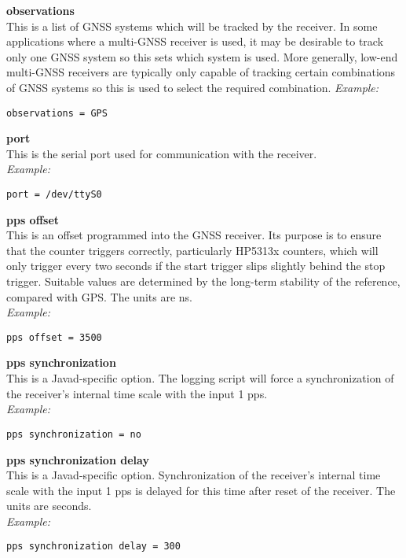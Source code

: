 {\bfseries observations}\\
This is a list of GNSS systems which will be tracked by the receiver. 
In some applications where a multi-GNSS receiver is used, it may be desirable to track
only one GNSS system so this sets which system is used.
More generally, low-end multi-GNSS receivers are typically only capable of tracking
certain combinations of GNSS systems so this is used to select the required combination.
\textit{Example:}
\begin{lstlisting}
observations = GPS
\end{lstlisting}

{\bfseries port}\\
This is the serial port used for communication with the receiver.\\
\textit{Example:}
\begin{lstlisting}
port = /dev/ttyS0
\end{lstlisting}

{\bfseries pps offset}\\ 
This is an offset programmed into the GNSS receiver. Its purpose is to ensure that the counter
triggers correctly, particularly HP5313x counters, which will only trigger every two seconds if the 
start trigger slips slightly behind the stop trigger. Suitable values are determined by the long-term stability of the
reference, compared with GPS.
The units are ns.\\
\textit{Example:}
\begin{lstlisting}
pps offset = 3500
\end{lstlisting}

{\bfseries pps synchronization}\\ \hypertarget{h:pps_synchronization}{}
This is a Javad-specific option. The logging script will force a synchronization of the receiver's
internal time scale with the input 1 pps.\\
\textit{Example:}
\begin{lstlisting}
pps synchronization = no
\end{lstlisting}

{\bfseries pps synchronization delay}\\ \hypertarget{h:pps_synchronization_delay}{}
This is a Javad-specific option. Synchronization of the receiver's
internal time scale with the input 1 pps is delayed for this time after reset of the receiver.
The units are seconds.\\
\textit{Example:}
\begin{lstlisting}
pps synchronization delay = 300
\end{lstlisting}

